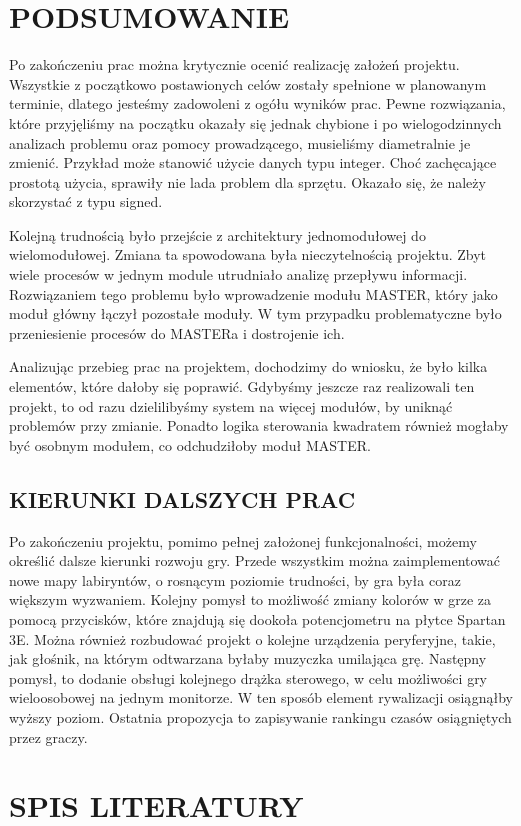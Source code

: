 \documentclass[11pt]{article}
\begin{document}
\section{PODSUMOWANIE}

Po zakończeniu prac można krytycznie ocenić realizację założeń projektu.
Wszystkie z początkowo postawionych celów zostały spełnione w planowanym terminie, dlatego jesteśmy zadowoleni z ogółu wyników prac.
Pewne rozwiązania, które przyjęliśmy na początku okazały się jednak chybione i po wielogodzinnych analizach problemu oraz pomocy prowadzącego, musieliśmy diametralnie je zmienić.
Przykład może stanowić użycie danych typu integer. Choć zachęcające prostotą użycia, sprawiły nie lada problem dla sprzętu. Okazało się, że należy skorzystać z typu signed.

Kolejną trudnością było przejście z architektury jednomodułowej do wielomodułowej.
Zmiana ta spowodowana była nieczytelnością projektu.
Zbyt wiele procesów w jednym module utrudniało analizę przepływu informacji.
Rozwiązaniem tego problemu było wprowadzenie modułu MASTER, który jako moduł główny łączył pozostałe moduły.
W tym przypadku problematyczne było przeniesienie procesów do MASTERa i dostrojenie ich.

Analizując przebieg prac na projektem, dochodzimy do wniosku, że było kilka elementów, które dałoby się poprawić.
Gdybyśmy jeszcze raz realizowali ten projekt, to od razu dzielilibyśmy system na więcej modułów, by uniknąć problemów przy zmianie.
Ponadto logika sterowania kwadratem również mogłaby być osobnym modułem, co odchudziłoby moduł MASTER.

\subsection{KIERUNKI DALSZYCH PRAC}

Po zakończeniu projektu, pomimo pełnej założonej funkcjonalności, możemy określić dalsze kierunki rozwoju gry.
Przede wszystkim można zaimplementować nowe mapy labiryntów, o rosnącym poziomie trudności, by gra była coraz większym wyzwaniem.
Kolejny pomysł to możliwość zmiany kolorów w grze za pomocą przycisków, które znajdują się dookoła potencjometru na płytce Spartan 3E.
Można również rozbudować projekt o kolejne urządzenia peryferyjne, takie, jak głośnik, na którym odtwarzana byłaby muzyczka umilająca grę.
Następny pomysł, to dodanie obsługi kolejnego drążka sterowego, w celu możliwości gry wieloosobowej na jednym monitorze.
W ten sposób element rywalizacji osiągnąłby wyższy poziom.
Ostatnia propozycja to zapisywanie rankingu czasów osiągniętych przez graczy.


\section{SPIS LITERATURY}
\end{document}
